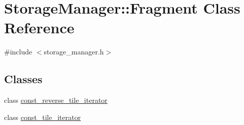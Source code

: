 \hypertarget{classStorageManager_1_1Fragment}{}\section{Storage\+Manager\+:\+:Fragment Class Reference}
\label{classStorageManager_1_1Fragment}


{\ttfamily \#include $<$storage\+\_\+manager.\+h$>$}

\subsection*{Classes}
\begin{DoxyCompactItemize}
\item 
class \hyperlink{classStorageManager_1_1Fragment_1_1const__reverse__tile__iterator}{const\+\_\+reverse\+\_\+tile\+\_\+iterator}
\item 
class \hyperlink{classStorageManager_1_1Fragment_1_1const__tile__iterator}{const\+\_\+tile\+\_\+iterator}
\end{DoxyCompactItemize}
